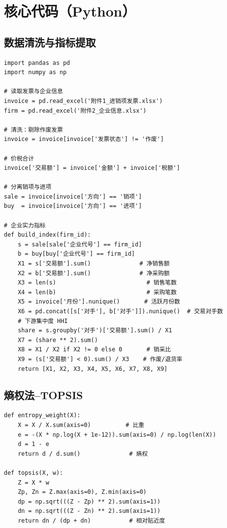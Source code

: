 \documentclass[12pt]{ctexart}
\begin{document}
\appendix
\section{核心代码（Python）}

\subsection{数据清洗与指标提取}

\begin{verbatim}
import pandas as pd
import numpy as np

# 读取发票与企业信息
invoice = pd.read_excel('附件1_进销项发票.xlsx')
firm = pd.read_excel('附件2_企业信息.xlsx')

# 清洗：剔除作废发票
invoice = invoice[invoice['发票状态'] != '作废']

# 价税合计
invoice['交易额'] = invoice['金额'] + invoice['税额']

# 分离销项与进项
sale = invoice[invoice['方向'] == '销项']
buy  = invoice[invoice['方向'] == '进项']

# 企业实力指标
def build_index(firm_id):
    s = sale[sale['企业代号'] == firm_id]
    b = buy[buy['企业代号'] == firm_id]
    X1 = s['交易额'].sum()              # 净销售额
    X2 = b['交易额'].sum()              # 净采购额
    X3 = len(s)                          # 销售笔数
    X4 = len(b)                          # 采购笔数
    X5 = invoice['月份'].nunique()       # 活跃月份数
    X6 = pd.concat([s['对手'], b['对手']]).nunique()  # 交易对手数
    # 下游集中度 HHI
    share = s.groupby('对手')['交易额'].sum() / X1
    X7 = (share ** 2).sum()
    X8 = X1 / X2 if X2 != 0 else 0       # 销采比
    X9 = (s['交易额'] < 0).sum() / X3    # 作废/退货率
    return [X1, X2, X3, X4, X5, X6, X7, X8, X9]
\end{verbatim}

\subsection{熵权法--TOPSIS}

\begin{verbatim}
def entropy_weight(X):
    X = X / X.sum(axis=0)          # 比重
    e = -(X * np.log(X + 1e-12)).sum(axis=0) / np.log(len(X))
    d = 1 - e
    return d / d.sum()              # 熵权

def topsis(X, w):
    Z = X * w
    Zp, Zn = Z.max(axis=0), Z.min(axis=0)
    dp = np.sqrt(((Z - Zp) ** 2).sum(axis=1))
    dn = np.sqrt(((Z - Zn) ** 2).sum(axis=1))
    return dn / (dp + dn)           # 相对贴近度
\end{verbatim}
\end{document}
